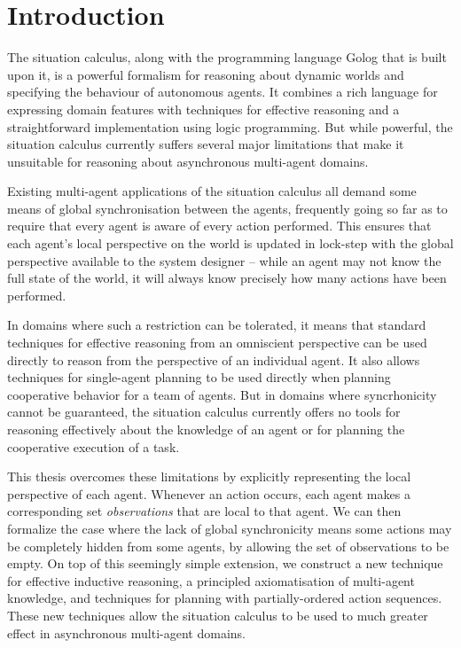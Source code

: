 

\chapter{Introduction}\label{ch:intro}

The situation calculus, along with the programming language Golog
that is built upon it, is a powerful formalism for reasoning about
dynamic worlds and specifying the behaviour of autonomous agents.
It combines a rich language for expressing domain features with techniques
for effective reasoning and a straightforward implementation using
logic programming. But while powerful, the situation calculus currently
suffers several major limitations that make it unsuitable for reasoning
about asynchronous multi-agent domains.

Existing multi-agent applications of the situation calculus all demand
some means of global synchronisation between the agents, frequently
going so far as to require that every agent is aware of every action
performed. This ensures that each agent's local perspective on the
world is updated in lock-step with the global perspective available
to the system designer -- while an agent may not know the full state
of the world, it will always know precisely how many actions have
been performed.

In domains where such a restriction can be tolerated, it means that
standard techniques for effective reasoning from an omniscient perspective
can be used directly to reason from the perspective of an individual
agent. It also allows techniques for single-agent planning to be used
directly when planning cooperative behavior for a team of agents.
But in domains where syncrhonicity cannot be guaranteed, the situation
calculus currently offers no tools for reasoning effectively about
the knowledge of an agent or for planning the cooperative execution
of a task.

This thesis overcomes these limitations by explicitly representing
the local perspective of each agent. Whenever an action occurs, each
agent makes a corresponding set \emph{observations} that are local
to that agent. We can then formalize the case where the lack of global
synchronicity means some actions may be completely hidden from some
agents, by allowing the set of observations to be empty. On top of
this seemingly simple extension, we construct a new technique for
effective inductive reasoning, a principled axiomatisation of multi-agent
knowledge, and techniques for planning with partially-ordered action
sequences. These new techniques allow the situation calculus to be
used to much greater effect in asynchronous multi-agent domains. 


